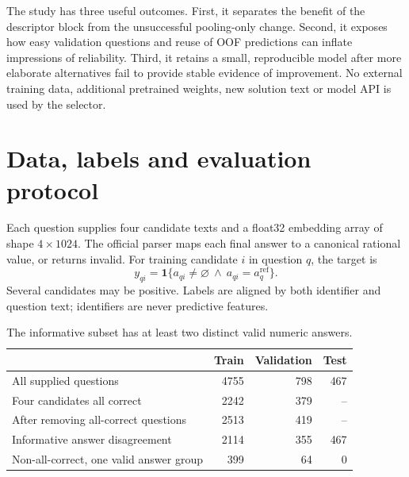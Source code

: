 \documentclass[11pt,a4paper]{article}
\newcommand{\pageheading}[1]{\section{#1}}
\begin{document}
\begin{center}
\end{center}

The study has three useful outcomes. First, it separates the benefit of the
descriptor block from the unsuccessful pooling-only change. Second, it exposes
how easy validation questions and reuse of OOF predictions can inflate
impressions of reliability. Third, it retains a small, reproducible model after
more elaborate alternatives fail to provide stable evidence of improvement.
No external training data, additional pretrained weights, new solution text or
model API is used by the selector.

\newpage
\pageheading{Data, labels and evaluation protocol}
Each question supplies four candidate texts and a float32 embedding array of
shape $4\times1024$. The official parser maps each final answer to a canonical
rational value, or returns invalid. For training candidate $i$ in question $q$,
the target is
\[
y_{qi}=\mathbf{1}\{a_{qi}\ne\varnothing\ \land\ a_{qi}=a_q^{\mathrm{ref}}\}.
\]
Several candidates may be positive. Labels are aligned by both identifier and
question text; identifiers are never predictive features.

\begin{table}[h]\centering
\caption{The informative subset has at least two distinct valid numeric answers.}
\begin{tabular}{lrrr}\toprule
 & Train & Validation & Test \\\midrule
All supplied questions & 4755 & 798 & 467 \\
Four candidates all correct & 2242 & 379 & -- \\
After removing all-correct questions & 2513 & 419 & -- \\
Informative answer disagreement & 2114 & 355 & 467 \\
Non-all-correct, one valid answer group & 399 & 64 & 0 \\
\bottomrule\end{tabular}
\end{table}
\end{document}
